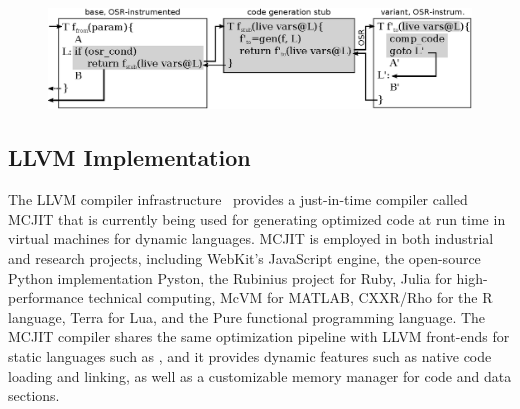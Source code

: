 
\ifdefined\noauthorea
\begin{figure}[t]
\begin{center}
\includegraphics[width=1.0\textwidth]{figures/osr-open/osr-open.eps}
\caption{\protect}
\end{center}
\end{figure}
\fi

\subsection{LLVM Implementation}
\label{ss:osrkit-implementation}

The LLVM compiler infrastructure~\cite{Lattner04} provides a just-in-time compiler called MCJIT that is currently being used for generating optimized code at run time in virtual machines for dynamic languages. MCJIT is employed in both industrial and research projects, including WebKit's JavaScript engine, the open-source Python implementation Pyston, the Rubinius project for Ruby, Julia for high-performance technical computing, McVM for MATLAB, CXXR/Rho for the R language, Terra for Lua, and the Pure functional programming language. The MCJIT compiler shares the same optimization pipeline with LLVM front-ends for static languages such as \clang, and it provides dynamic features such as native code loading and linking, as well as a customizable memory manager for code and data sections.

